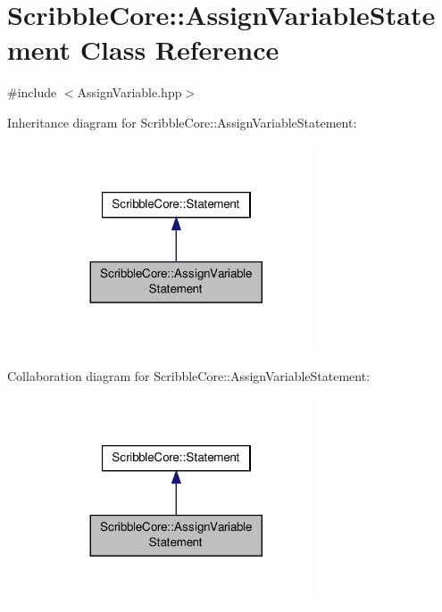 \hypertarget{class_scribble_core_1_1_assign_variable_statement}{\section{Scribble\-Core\-:\-:Assign\-Variable\-Statement Class Reference}
\label{class_scribble_core_1_1_assign_variable_statement}
}


{\ttfamily \#include $<$Assign\-Variable.\-hpp$>$}



Inheritance diagram for Scribble\-Core\-:\-:Assign\-Variable\-Statement\-:
\nopagebreak
\begin{figure}[H]
\begin{center}
\leavevmode
\includegraphics[width=224pt]{class_scribble_core_1_1_assign_variable_statement__inherit__graph}
\end{center}
\end{figure}


Collaboration diagram for Scribble\-Core\-:\-:Assign\-Variable\-Statement\-:
\nopagebreak
\begin{figure}[H]
\begin{center}
\leavevmode
\includegraphics[width=224pt]{class_scribble_core_1_1_assign_variable_statement__coll__graph}
\end{center}
\end{figure}

